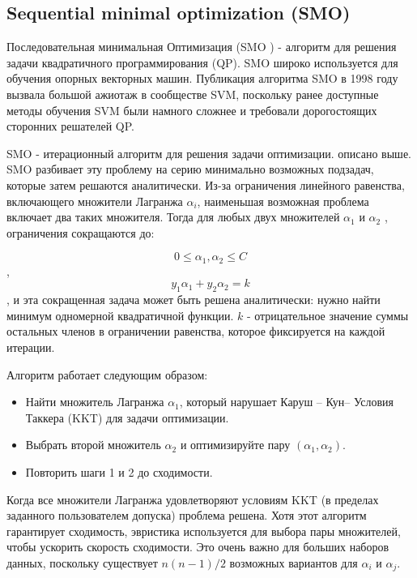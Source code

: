 \documentclass[12pt,a4paper]{article}
\begin{document}
	\subsection{Sequential minimal optimization (SMO)}
	Последовательная минимальная Оптимизация (SMO ) - алгоритм для решения задачи квадратичного программирования (QP).  SMO широко используется для обучения опорных векторных машин. Публикация алгоритма SMO в 1998 году вызвала большой ажиотаж в сообществе SVM, поскольку ранее доступные методы обучения SVM были намного сложнее и требовали дорогостоящих сторонних решателей QP.
	
	SMO - итерационный алгоритм для решения задачи оптимизации. описано выше. SMO разбивает эту проблему на серию минимально возможных подзадач, которые затем решаются аналитически. Из-за ограничения линейного равенства, включающего множители Лагранжа $\alpha_{i}$, наименьшая возможная проблема включает два таких множителя. Тогда для любых двух множителей $\alpha_{1}$ и $\alpha_{2}$ , ограничения сокращаются до:
	
$$0 \leq \alpha_{1}, \alpha_{2} \leq C$$,
$$ y_{1}\alpha_{1} + y_{2}\alpha_{2} = k$$ 
	, и эта сокращенная задача может быть решена аналитически: нужно найти минимум одномерной квадратичной функции. $k$ - отрицательное значение суммы остальных членов в ограничении равенства, которое фиксируется на каждой итерации.
	
	Алгоритм работает следующим образом:
	
	\begin{itemize}
		\item Найти множитель Лагранжа $\alpha_{1}$, который нарушает Каруш – Кун– Условия Таккера (KKT) для задачи оптимизации.
		\item Выбрать второй множитель $\alpha_{2}$ и оптимизируйте пару $(\alpha_{1}, \alpha_{2})$.
		\item Повторить шаги 1 и 2 до сходимости.
	\end{itemize}	
	
	Когда все множители Лагранжа удовлетворяют условиям KKT (в пределах заданного пользователем допуска) проблема решена. Хотя этот алгоритм гарантирует сходимость, эвристика используется для выбора пары множителей, чтобы ускорить скорость сходимости. Это очень важно для больших наборов данных, поскольку существует $n(n-1)/2$ возможных вариантов для $\alpha_{i}$ и $\alpha_{j}$.
	
\end{document}
